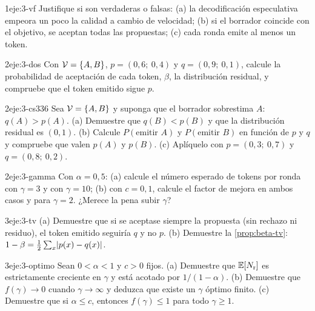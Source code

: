 \begin{ejercicio}{1}{eje:3-vf}
Justifique si son verdaderas o falsas: (a) la decodificación especulativa empeora un poco la calidad a cambio de velocidad; (b) si el borrador coincide con el objetivo, se aceptan todas las propuestas; (c) cada ronda emite al menos un token.
\end{ejercicio}

\begin{ejercicio}{2}{eje:3-dos}
Con $\mathcal{V}=\{A,B\}$, $p=(0{,}6;\allowbreak\ 0{,}4)$ y $q=(0{,}9;\allowbreak\ 0{,}1)$, calcule la probabilidad de aceptación de cada token, $\beta$, la distribución residual, y compruebe que el token emitido sigue $p$.
\end{ejercicio}

\begin{ejercicio}{2}{eje:3-cs336}
Sea $\mathcal{V}=\{A,B\}$ y suponga que el borrador sobrestima $A$: $q(A)>p(A)$. (a) Demuestre que $q(B)<p(B)$ y que la distribución residual es $(0,1)$. (b) Calcule $P(\text{emitir }A)$ y $P(\text{emitir }B)$ en función de $p$ y $q$ y compruebe que valen $p(A)$ y $p(B)$. (c) Aplíquelo con $p=(0{,}3;\allowbreak\ 0{,}7)$ y $q=(0{,}8;\allowbreak\ 0{,}2)$.
\end{ejercicio}

\begin{ejercicio}{2}{eje:3-gamma}
Con $\alpha=0{,}5$: (a) calcule el número esperado de tokens por ronda con $\gamma=3$ y con $\gamma=10$; (b) con $c=0{,}1$, calcule el factor de mejora en ambos casos y para $\gamma=2$. ¿Merece la pena subir $\gamma$?
\end{ejercicio}

\begin{ejercicio}{3}{eje:3-tv}
(a) Demuestre que si se aceptase siempre la propuesta (sin rechazo ni residuo), el token emitido seguiría $q$ y no $p$. (b) Demuestre la \cref{prop:beta-tv}: $1-\beta=\frac12\sum_x\lvert p(x)-q(x)\rvert$.
\end{ejercicio}

\begin{ejercicio}{3}{eje:3-optimo}
Sean $0<\alpha<1$ y $c>0$ fijos. (a) Demuestre que $\mathbb{E}[N_{\mathrm{r}}]$ es estrictamente creciente en $\gamma$ y está acotado por $1/(1-\alpha)$. (b) Demuestre que $f(\gamma)\to 0$ cuando $\gamma\to\infty$ y deduzca que existe un $\gamma$ óptimo finito. (c) Demuestre que si $\alpha\le c$, entonces $f(\gamma)\le 1$ para todo $\gamma\ge 1$.
\end{ejercicio}
